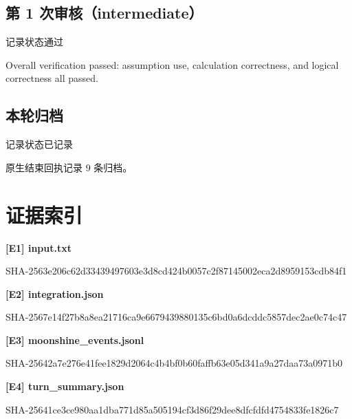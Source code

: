 \documentclass[UTF8,a4paper,11pt]{ctexart}
\begin{document}
\subsection*{第 1 次审核（intermediate）}
{\small\color{muted} 记录状态\enspace 通过}\par
Overall verification passed: assumption use, calculation correctness, and logical correctness all passed.
\par{}\par
\subsection*{本轮归档}
{\small\color{muted} 记录状态\enspace 已记录}\par
原生结束回执记录 9 条归档。
\par{}\par
\section{证据索引}
\noindent\textbf{[E1] input.txt}\par
{\footnotesize\color{muted} SHA-256\quad 3e206c62d334\allowbreak{}39497603e3d8\allowbreak{}cd424b0057c2\allowbreak{}f87145002eca\allowbreak{}2d8959153cdb\allowbreak{}84f1}\par
\noindent\textbf{[E2] integration.json}\par
{\footnotesize\color{muted} SHA-256\quad 7e14f27b8a8e\allowbreak{}a21716ca9e66\allowbreak{}79439880135c\allowbreak{}6bd0a6dcddc5\allowbreak{}857dec2ae0c7\allowbreak{}4c47}\par
\noindent\textbf{[E3] moonshine\_events.jsonl}\par
{\footnotesize\color{muted} SHA-256\quad 42a7e276e41f\allowbreak{}ee1829d2064c\allowbreak{}4b4bf0b60faf\allowbreak{}fb63e05d341a\allowbreak{}9a27daa73a09\allowbreak{}71b0}\par
\noindent\textbf{[E4] turn\_summary.json}\par
{\footnotesize\color{muted} SHA-256\quad 41ce3ce980aa\allowbreak{}1dba771d85a5\allowbreak{}05194cf3d86f\allowbreak{}29dee8dfcfdf\allowbreak{}d4754833fe18\allowbreak{}26c7}\par
\end{document}
